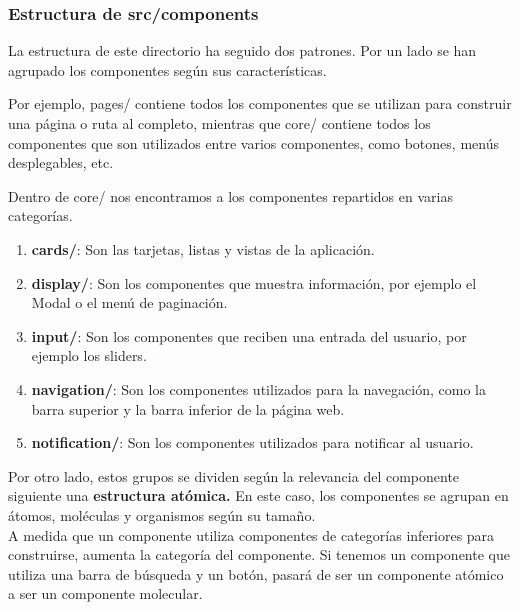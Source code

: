 \subsubsection{Estructura de src/components}\label{componentes_dir}

La estructura de este directorio ha seguido dos patrones. Por un lado se han agrupado los componentes según sus características. 

Por ejemplo, pages/ contiene todos los componentes que se utilizan para construir una página o ruta al completo, mientras que core/ contiene todos los componentes que son utilizados entre varios componentes, como botones, menús desplegables, etc.

Dentro de core/ nos encontramos a los componentes repartidos en varias categorías.
\begin{enumerate}
    \item \textbf{cards/}: Son las tarjetas, listas y vistas de la aplicación.
    \item \textbf{display/}: Son los componentes que muestra información, por ejemplo el Modal o el menú de paginación.
    \item \textbf{input/}: Son los componentes que reciben una entrada del usuario, por ejemplo los sliders.
    \item \textbf{navigation/}: Son los componentes utilizados para la navegación, como la barra superior y la barra inferior de la página web.
    \item \textbf{notification/}: Son los componentes utilizados para notificar al usuario. 
\end{enumerate}

Por otro lado, estos grupos se dividen según la relevancia del componente siguiente una \textbf{estructura atómica.}
En este caso, los componentes se agrupan en átomos, moléculas y organismos según su tamaño.\\
A medida que un componente utiliza componentes de categorías inferiores para construirse, aumenta la categoría del componente.
Si tenemos un componente que utiliza una barra de búsqueda y un botón, pasará de ser un componente atómico a ser un componente molecular. 

